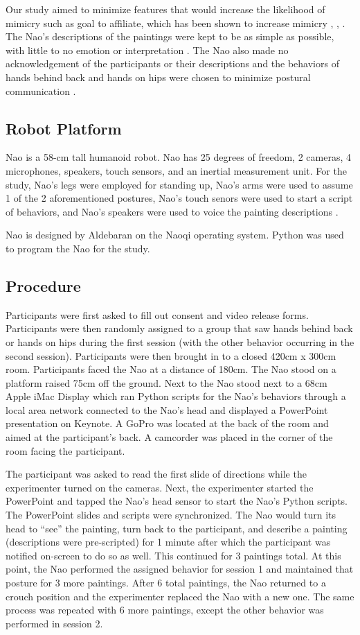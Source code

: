 \documentclass{acm_proc_article-sp}
\begin{document}
Our study aimed to minimize features that would increase the likelihood of mimicry such as goal to affiliate, which has been shown to increase mimicry \cite{chartrand2013antecedents}, \cite{drury2006effects}, \cite{lakin2003using}. The Nao's descriptions of the paintings were kept to be as simple as possible, with little to no emotion or interpretation \cite{hofree2014bridging}. The Nao also made no acknowledgement of the participants or their descriptions and the behaviors of hands behind back and hands on hips were chosen to minimize postural communication . 

\subsection{Robot Platform}
Nao is a 58-cm tall humanoid robot. Nao has 25 degrees of freedom, 2 cameras, 4 microphones, speakers, touch sensors, and an inertial measurement unit. For the study, Nao's legs were employed for standing up, Nao's arms were used to assume 1 of the 2 aforementioned postures, Nao's touch senors were used to start a script of behaviors, and Nao's speakers were used to voice the painting descriptions \cite{naodocumentation}. 

Nao is designed by Aldebaran on the Naoqi operating system. Python was used to program the Nao for the study. 

\subsection{Procedure}
Participants were first asked to fill out consent and video release forms. Participants were then randomly assigned to a group that saw hands behind back or hands on hips during the first session (with the other behavior occurring in the second session). Participants were then brought in to a closed 420cm x 300cm room. Participants faced the Nao at a distance of 180cm. The Nao stood on a platform raised 75cm off the ground. Next to the Nao stood next to a 68cm Apple iMac Display which ran Python scripts for the Nao's behaviors through a local area network connected to the Nao's head and displayed a PowerPoint presentation on Keynote. A GoPro was located at the back of the room and aimed at the participant's back. A camcorder was placed in the corner of the room facing the participant.

The participant was asked to read the first slide of directions while the experimenter turned on the cameras. Next, the experimenter started the PowerPoint and tapped the Nao's head sensor to start the Nao's Python scripts. The PowerPoint slides and scripts were synchronized. The Nao would turn its head to ``see'' the painting, turn back to the participant, and describe a painting (descriptions were pre-scripted) for 1 minute after which the participant was notified on-screen to do so as well. This continued for 3 paintings total. At this point, the Nao performed the assigned behavior for session 1 and maintained that posture for 3 more paintings. After 6 total paintings, the Nao returned to a crouch position and the experimenter replaced the Nao with a new one. The same process was repeated with 6 more paintings, except the other behavior was performed in session 2. 
\end{document}
